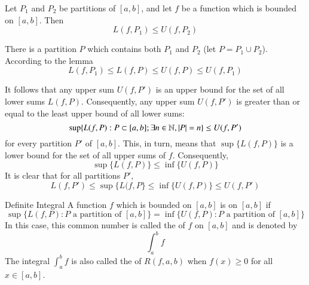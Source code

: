 \documentclass[12pt]{report}
\begin{document}
\clearpage

\begin{thm}{}{}
    Let $P_1$ and $P_2$ be partitions of $[a,b]$, and let $f$ be a function which is bounded on $[a,b]$. Then \begin{equation}
        L(f,P_1) \leq U(f,P_2)
    \end{equation}
\end{thm}
\begin{proof*}{}{}
    There is a partition $P$ which contains both $P_1$ and $P_2$ (let $P = P_1 \cup P_2$). According to the lemma \begin{equation*}
        L(f,P_1) \leq L(f,P) \leq U(f,P) \leq U(f,P_1)
    \end{equation*}
\end{proof*}

\begin{rmk}{}{}
    It follows that any upper sum $U(f,P')$ is an upper bound for the set of all lower sums $L(f,P)$. Consequently, any upper sum $U(f,P')$     is greater than or equal to the least upper bound of all lower sums:\begin{equation}
        \sup\{L(f,P):P\subset [a,b];\exists n \in \mathbb N,|P| = n\} \leq U(f,P')
    \end{equation}
    for every partition $P'$ of $[a,b]$. This, in turn, means that $\sup\{L(f,P)\}$ is a lower bound for the set of all upper sums of $f$.      Consequently, \begin{equation}
        \sup\{L(f,P)\} \leq \inf\{U(f,P)\}
    \end{equation}
    It is clear that for all partitions $P'$, \begin{equation}
        L(f,P') \leq \sup\{L(f,P\} \leq \inf\{U(f,P)\} \leq U(f,P')
    \end{equation}
\end{rmk}

\begin{defn}{Definite Integral}{}
    A function $f$ which is bounded on $[a,b]$ is  on $[a,b]$ if $$\sup\{L(f,P):P\text{ a partition of } [a,b]\} =
    \inf\{U(f,P):P\text{ a partition of } [a,b]\}$$
    In this case, this common number is called the  of $f$ on $[a,b]$ and is denoted by \begin{equation}                             \int_a^bf
    \end{equation}
    The integral $\int_a^bf$ is also called the  of $R(f,a,b)$ when $f(x) \geq 0$ for all $x \in [a,b]$.
\end{defn}
\end{document}
